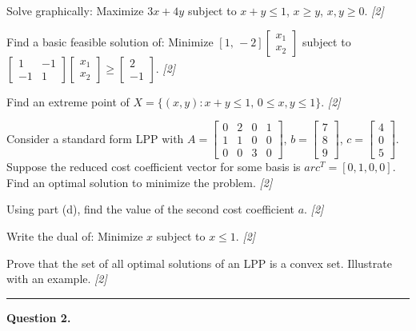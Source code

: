 \documentclass[11pt,a4paper]{article}
\newcommand{\pts}[1]{\hfill   \textit{[#1]}}
\begin{document}
\begin{parts}
  \item Solve graphically: Maximize $3x + 4y$ subject to $x + y \le 1$, $x \ge y$, $x, y \ge 0$. \pts{2}
  \item Find a basic feasible solution of: Minimize $[1,\,-2]
\begin{bmatrix}x_1\\x_2\end{bmatrix}$ subject to $
\begin{bmatrix}1 & -1\\-1 & 1\end{bmatrix}
\begin{bmatrix}x_1\\x_2\end{bmatrix} \ge 
\begin{bmatrix}2\\-1\end{bmatrix}$. \pts{2}
  \item Find an extreme point of $X = \{(x,y): x + y \le 1,\, 0 \le x,y \le 1\}$. \pts{2}
  \item Consider a standard form LPP with $A = 
\begin{bmatrix}0 & 2 & 0 & 1\\1 & 1 & 0 & 0\\0 & 0 & 3 & 0\end{bmatrix}$, $b = 
\begin{bmatrix}7\\8\\9\end{bmatrix}$, $c = 
\begin{bmatrix}4\\0\\5\end{bmatrix}$. Suppose the reduced cost coefficient vector for some basis is $ar{c}^T = [0, 1, 0, 0]$. Find an optimal solution to minimize the problem. \pts{2}
  \item Using part (d), find the value of the second cost coefficient $a$. \pts{2}
  \item Write the dual of: Minimize $x$ subject to $x \le 1$. \pts{2}
  \item Prove that the set of all optimal solutions of an LPP is a convex set. Illustrate with an example. \pts{2}
\end{parts}

\medskip\rule{\linewidth}{0.2pt}

\medskip


\noindent   \textbf{Question 2.}
\end{document}
